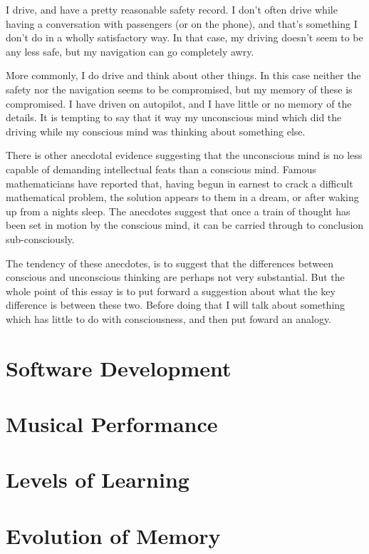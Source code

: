 \documentclass[10pt,titlepage]{article}
\begin{document}
I drive, and have a pretty reasonable safety record.
I don't often drive while having a conversation with passengers (or on the phone), and that's something I don't do in a wholly satisfactory way.
In that case, my driving doesn't seem to be any less safe, but my navigation can go completely awry.

More commonly, I do drive and think about other things.
In this case neither the safety nor the navigation seems to be compromised, but my memory of these is compromised.
I have driven on autopilot, and I have little or no memory of the details.
It is tempting to say that it way my unconscious mind which did the driving while my conscious mind was thinking about something else.

There is other anecdotal evidence suggesting that the unconscious mind is no less capable of demanding intellectual feats than a conscious mind.
Famous mathematicians have reported that, having begun in earnest to crack a difficult mathematical problem, the solution appears to them in a dream, or after waking up from a nights sleep.
The anecdotes suggest that once a train of thought has been set in motion by the conscious mind, it can be carried through to conclusion sub-consciously.

The tendency of these anecdotes, is to suggest that the differences between conscious and unconscious thinking are perhaps not very substantial.
But the whole point of this essay is to put forward a suggestion about what the key difference is between these two.
Before doing that I will talk about something which has little to do with consciousness, and then put foward an analogy.

\section{Software Development}

\section{Musical Performance}

\section{Levels of Learning}

\section{Evolution of Memory}

\cite{murray2019evolutionary}

{}








\end{document}
